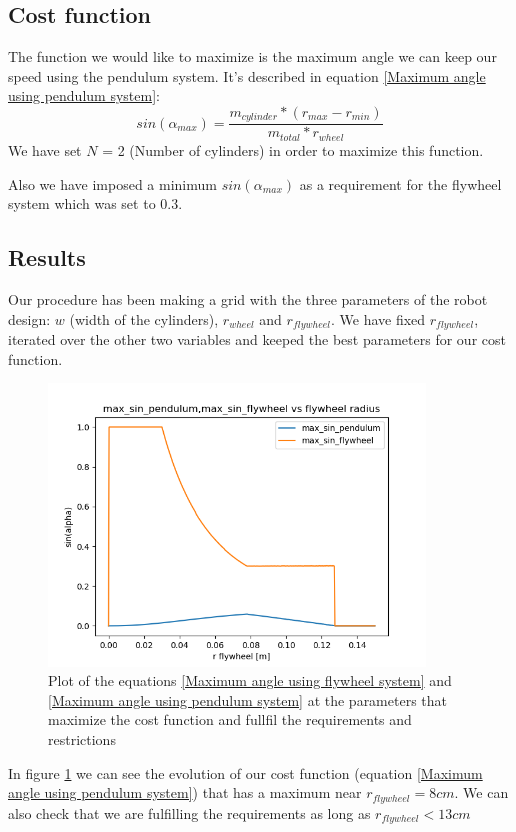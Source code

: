 \subsection{Cost function}
The function we would like to maximize is the maximum angle we can keep our speed using the pendulum system.
It's described in equation \ref{Maximum angle using pendulum system}:
\[sin(\alpha_{max}) = \frac{m_{cylinder} * (r_{max}- r_{min})}{m_{total} * r_{wheel}}\]
We have set $N$ = 2 (Number of cylinders) in order to maximize this function.

Also we have imposed a minimum $sin(\alpha_{max})$ as a requirement for the flywheel system which was set to $0.3$.


\subsection{Results}
Our procedure has been making a grid with the three parameters of the robot design: $w$ (width of the cylinders), $r_{wheel}$ and $r_{flywheel}$.
We have fixed $r_{flywheel}$, iterated over the other two variables and keeped the best parameters for our cost function.

\begin{figure}[H]
	\centering
	\includegraphics[width=10cm]{img/optimization/sin.png}
	\caption{Plot of the equations \ref{Maximum angle using flywheel system} and \ref{Maximum angle using pendulum system} at the parameters that maximize the cost function and fullfil the requirements and restrictions}
	\label{fig:Sinus plot}
\end{figure}
In figure \ref{fig:Sinus plot} we can see the evolution of our cost function (equation \ref{Maximum angle using pendulum system}) that has a maximum near $r_{flywheel} = 8cm$.
We can also check that we are fulfilling the requirements as long as $r_{flywheel}<13cm$ 

